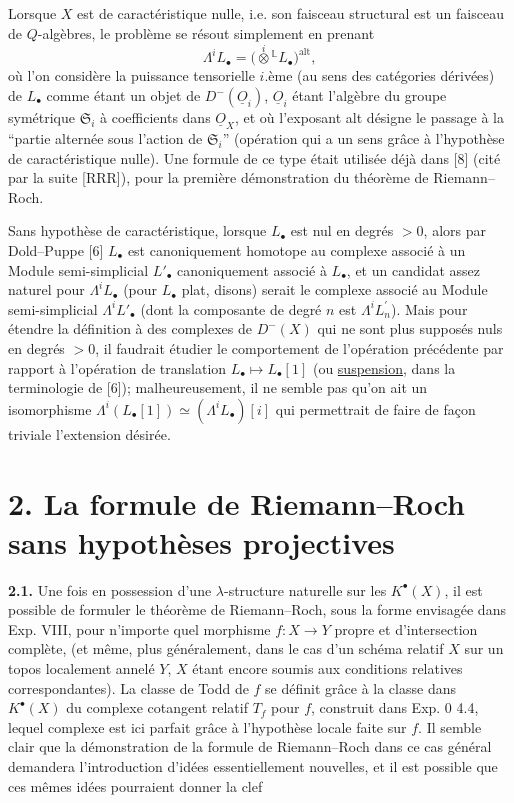 
Lorsque $X$ est de caractéristique nulle, i.e. son faisceau structural est un faisceau de $Q$-algèbres, le problème se résout simplement en prenant
\begin{equation}\tag{1.2}
 \Lambda^i L_\bullet=\bigl(\overset{i}{\otimes}{}^{\mathbb L}L_\bullet\bigr)^{\mathrm{alt}},
\end{equation}
où l'on considère la puissance tensorielle $i$.ème (au sens des catégories dérivées) de $L_\bullet$ comme étant un objet de $D^-(\underline{O}_i)$, $\underline{O}_i$ étant l'algèbre du groupe symétrique $\mathfrak S_i$ à coefficients dans $\underline{O}_X$, et où l'exposant alt désigne le passage à la ``partie alternée sous l'action de $\mathfrak S_i$'' (opération qui a un sens grâce à l'hypothèse de caractéristique nulle). Une formule de ce type était utilisée déjà dans [8] (cité par la suite [RRR]), pour la première démonstration du théorème de Riemann--Roch.

Sans hypothèse de caractéristique, lorsque $L_\bullet$ est nul en degrés $>0$, alors par Dold--Puppe [6] $L_\bullet$ est canoniquement homotope au complexe associé à un Module semi-simplicial $L'_\bullet$ canoniquement associé à $L_\bullet$, et un candidat assez naturel pour $\Lambda^iL_\bullet$ (pour $L_\bullet$ plat, disons) serait le complexe associé au Module semi-simplicial $\Lambda^iL'_\bullet$ (dont la composante de degré $n$ est $\Lambda^i L^{\prime}_n$). Mais pour étendre la définition à des complexes de $D^-(X)$ qui ne sont plus supposés nuls en degrés $>0$, il faudrait étudier le comportement de l'opération précédente par rapport à l'opération de translation $L_\bullet\mapsto L_\bullet[1]$ (ou \uline{suspension}, dans la terminologie de [6]); malheureusement, il ne semble pas qu'on ait un isomorphisme $\Lambda^i(L_\bullet[1])\simeq(\Lambda^i L_\bullet)[i]$ qui permettrait de faire de façon triviale l'extension désirée.

\section*{2. La formule de Riemann--Roch sans hypothèses projectives}

\textbf{2.1.} Une fois en possession d'une $\lambda$-structure naturelle sur les $K^\bullet(X)$, il est possible de formuler le théorème de Riemann--Roch, sous la forme envisagée dans Exp. VIII, pour n'importe quel morphisme $f:X\to Y$ propre et d'intersection complète, (et même, plus généralement, dans le cas d'un schéma relatif $X$ sur un topos localement annelé $Y$, $X$ étant encore soumis aux conditions relatives correspondantes). La classe de Todd de $f$ se définit grâce à la classe dans $K^\bullet(X)$ du complexe cotangent relatif $T_f$ pour $f$, construit dans Exp. 0 4.4, lequel complexe est ici parfait grâce à l'hypothèse locale faite sur $f$. Il semble clair que la démonstration de la formule de Riemann--Roch dans ce cas général demandera l'introduction d'idées essentiellement nouvelles, et il est possible que ces mêmes idées pourraient donner la clef 
